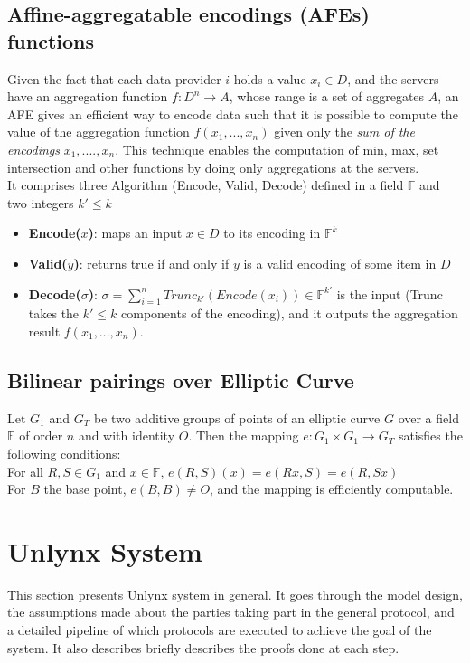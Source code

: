 \documentclass{article}
\begin{document}
\subsection{Affine-aggregatable encodings (AFEs) functions}
\label{afe}
Given the fact that each data provider $i$ holds a value $x_i \in D$, and the servers have an aggregation function $f : D^n \rightarrow A$, whose range is a set of aggregates $A$, an AFE gives an efficient way to encode data such that it is possible to compute the value of the aggregation function $f(x_1,...,x_n)$ given only the \textit{sum of the encodings} $x_1,....,x_n$. This technique enables the computation of min, max, set intersection and other functions by doing only aggregations at the servers.\\
It comprises three Algorithm (Encode, Valid, Decode) defined in a field $\mathbb{F}$ and two integers $k' \leq k$\\
\begin{itemize}
\item \textbf{Encode($x$)}: maps an input $x \in D$ to its encoding in $\mathbb{F}^k$
\item \textbf{Valid($y$)}: returns true if and only if $y$ is a valid encoding of some item in $D$
\item \textbf{Decode($\sigma$)}: $\sigma = \sum_{i=1}^{n}{Trunc_{k'}(Encode(x_i))} \in \mathbb{F}^{k'}$ is the input (Trunc takes the $k' \leq k$ components of the encoding), and it outputs the aggregation result $f(x_1,...,x_n)$.
\end{itemize}

\subsection{Bilinear pairings over Elliptic Curve}
Let $G_1$ and $G_T$ be two additive groups of points of an elliptic curve $G$ over a field $\mathbb{F}$ of order $n$ and with identity $O$. Then the mapping $e: G_1 \times G_1 \rightarrow G_T$ satisfies the following conditions:\\
For all $R,S \in G_1$ and $x \in \mathbb{F}$, $e(R,S)(x) = e(Rx,S) = e(R,Sx)$\\
For $B$ the base point, $e(B,B) \neq O$, and the mapping is efficiently computable.


\section{Unlynx System}
This section presents Unlynx \cite{unlynx} system in general. It goes through the model design, the assumptions made about the parties taking part in the general protocol, and a detailed pipeline of which protocols are executed to achieve the goal of the system. It also describes briefly describes the proofs done at each step.\\
\end{document}
